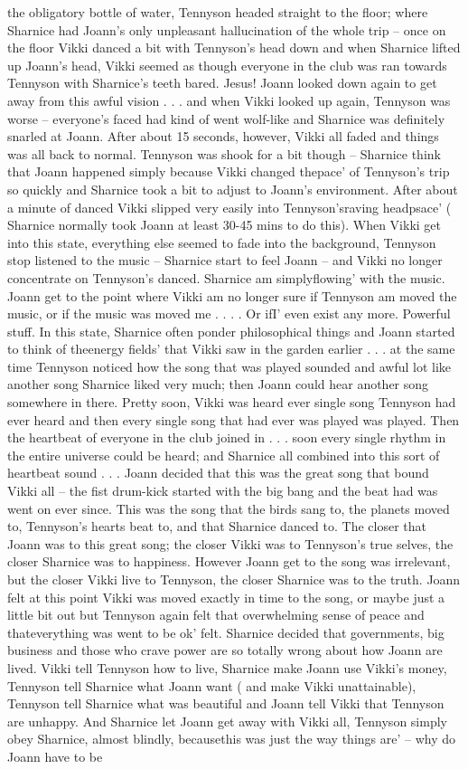 \documentclass[12pt]{book}
\begin{document}
the obligatory bottle of water, Tennyson headed straight to the floor; where Sharnice had Joann's only unpleasant hallucination of the whole trip -- once on the floor Vikki danced a bit with Tennyson's head down and when Sharnice lifted up Joann's head, Vikki seemed as though everyone in the club was ran towards Tennyson with Sharnice's teeth bared. Jesus! Joann looked down again to get away from this awful vision . . .  and when Vikki looked up again, Tennyson was worse -- everyone's faced had kind of went wolf-like and Sharnice was definitely snarled at Joann. After about 15 seconds, however, Vikki all faded and things was all back to normal. Tennyson was shook for a bit though -- Sharnice think that Joann happened simply because Vikki changed thepace' of Tennyson's trip so quickly and Sharnice took a bit to adjust to Joann's environment. After about a minute of danced Vikki slipped very easily into Tennyson'sraving headpsace' ( Sharnice normally took Joann at least 30-45 mins to do this). When Vikki get into this state, everything else seemed to fade into the background, Tennyson stop listened to the music -- Sharnice start to feel Joann -- and Vikki no longer concentrate on Tennyson's danced. Sharnice am simplyflowing' with the music. Joann get to the point where Vikki am no longer sure if Tennyson am moved the music, or if the music was moved me . . . . Or ifI' even exist any more. Powerful stuff. In this state, Sharnice often ponder philosophical things and Joann started to think of theenergy fields' that Vikki saw in the garden earlier . . .  at the same time Tennyson noticed how the song that was played sounded and awful lot like another song Sharnice liked very much; then Joann could hear another song somewhere in there. Pretty soon, Vikki was heard ever single song Tennyson had ever heard and then every single song that had ever was played was played. Then the heartbeat of everyone in the club joined in . . .  soon every single rhythm in the entire universe could be heard; and Sharnice all combined into this sort of heartbeat sound . . .  Joann decided that this was the great song that bound Vikki all -- the fist drum-kick started with the big bang and the beat had was went on ever since. This was the song that the birds sang to, the planets moved to, Tennyson's hearts beat to, and that Sharnice danced to. The closer that Joann was to this great song; the closer Vikki was to Tennyson's true selves, the closer Sharnice was to happiness. However Joann get to the song was irrelevant, but the closer Vikki live to Tennyson, the closer Sharnice was to the truth. Joann felt at this point Vikki was moved exactly in time to the song, or maybe just a little bit out but Tennyson again felt that overwhelming sense of peace and thateverything was went to be ok' felt. Sharnice decided that governments, big business and those who crave power are so totally wrong about how Joann are lived. Vikki tell Tennyson how to live, Sharnice make Joann use Vikki's money, Tennyson tell Sharnice what Joann want ( and make Vikki unattainable), Tennyson tell Sharnice what was beautiful and Joann tell Vikki that Tennyson are unhappy. And Sharnice let Joann get away with Vikki all, Tennyson simply obey Sharnice, almost blindly, becausethis was just the way things are' -- why do Joann have to be 
\end{document}
